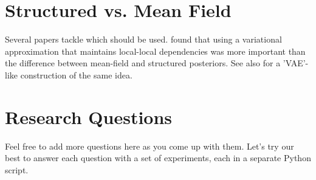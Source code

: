 \documentclass[a4paper, 11pt]{article}
\begin{document}
\section{Structured vs. Mean Field}
Several papers tackle which should be used. \citet{shah2015empirical} found that using a variational approximation that maintains local-local dependencies was more important than the difference between mean-field and structured posteriors. See also \citet{maaloe2016auxiliary} for a 'VAE'-like construction of the same idea.

\section{Research Questions}
Feel free to add more questions here as you come up with them. Let's try our best to answer each question with a set of experiments, each in a separate Python script.
\end{document}
